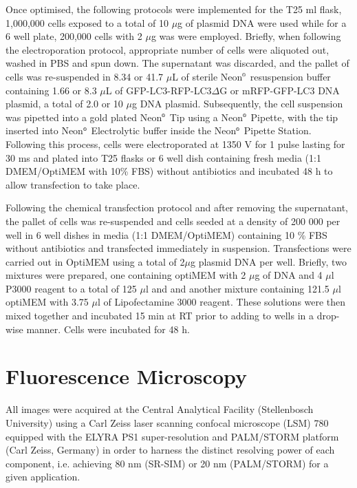 Once optimised, the following protocols were implemented for the T25 ml flask, 1,000,000 cells exposed to a total of 10 $\mu$g of plasmid DNA were used while for a 6 well plate, 200,000 cells with 2 $\mu$g was were employed. Briefly, when following the electroporation protocol, appropriate number of cells were aliquoted out, washed in PBS and spun down. The supernatant was discarded, and the pallet of cells was re-suspended in 8.34 or 41.7 $\mu$L of sterile Neon${\textsuperscript{\tiny{\textregistered}}}$ resuspension buffer containing 1.66 or 8.3 $\mu$L of GFP-LC3-RFP-LC3$\Delta$G or mRFP-GFP-LC3 DNA plasmid, a total of 2.0 or 10 $\mu$g DNA plasmid. Subsequently, the cell suspension was pipetted into a gold plated Neon${\textsuperscript{\tiny{\textregistered}}}$ Tip using a Neon${\textsuperscript{\tiny{\textregistered}}}$ Pipette, with the tip inserted into Neon${\textsuperscript{\tiny{\textregistered}}}$ Electrolytic buffer inside the Neon${\textsuperscript{\tiny{\textregistered}}}$ Pipette Station. Following this process, cells were electroporated at 1350 V for 1 pulse lasting for 30 ms and plated into T25 flasks or 6 well dish containing fresh media (1:1 DMEM/OptiMEM with 10\% FBS) without antibiotics and incubated 48 h to allow transfection to take place.

Following the chemical transfection protocol and after removing the supernatant, the pallet of cells was re-suspended and cells seeded at a density of 200 000 per well in 6 well dishes in media (1:1 DMEM/OptiMEM) containing 10 \% FBS without antibiotics and transfected immediately in suspension. Transfections were carried out in OptiMEM using a total of 2$\mu$g plasmid DNA per well. Briefly, two mixtures were prepared, one containing optiMEM with 2 $\mu$g of DNA and 4 $\mu$l P3000 reagent to a total of 125 $\mu$l and and another mixture containing 121.5 $\mu$l optiMEM with 3.75 $\mu$l of Lipofectamine 3000 reagent.  These solutions were then mixed together and incubated 15 min at RT prior to adding to wells in a drop-wise manner. Cells were incubated for 48 h. 

\section{Fluorescence Microscopy}
All images were acquired at the Central Analytical Facility (Stellenbosch University) using a Carl Zeiss laser scanning confocal microscope (LSM) 780 equipped with the ELYRA PS1 super-resolution and PALM/STORM platform (Carl Zeiss, Germany) in order to harness the distinct resolving power of each component, i.e. achieving 80 nm (SR-SIM) or 20 nm (PALM/STORM) for a given application.

